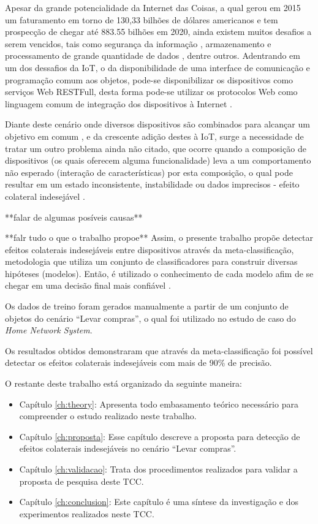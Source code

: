 Apesar da grande potencialidade da Internet das Coisas, a qual gerou em 2015 um faturamento em torno de 130,33 bilhões de dólares americanos e tem prospecção de chegar até 883.55 bilhões em 2020\footnotemark {}, ainda existem muitos desafios a serem vencidos, tais como segurança da informação \cite{Roman:2013}, armazenamento e processamento de grande quantidade de dados \cite{Zaslavsky:2013}, dentre outros. Adentrando em um dos dessafios da IoT, o da disponibilidade de uma interface de comunicação e programação comum aos objetos, pode-se disponibilizar os dispositivos como serviços Web RESTFull, desta forma pode-se utilizar os protocolos Web como linguagem comum de integração dos dispositivos à Internet \cite{Franca:2011, Mineraud:2016}.

Diante deste cenário onde diversos dispositivos são combinados para alcançar um objetivo em comum \cite{Kranz:2010, Atzori:2010, Whitmore:2015}, e da crescente adição destes à IoT, surge a necessidade de tratar um outro problema ainda não citado, que ocorre quando a composição de dispositivos (os quais oferecem alguma funcionalidade) leva a um comportamento não esperado (interação de características) por esta composição, o qual pode resultar em um estado inconsistente, instabilidade ou dados imprecisos - efeito colateral indesejável \cite{NHLABATSI:2008}.

**falar de algumas posíveis causas**

**falr tudo o que o trabalho propoe**
Assim, o presente trabalho propõe detectar efeitos colaterais indesejáveis entre dispositivos através da meta-classificação, metodologia que utiliza um conjunto de classificadores para construir diversas hipóteses (modelos). Então, é utilizado o conhecimento de cada modelo afim de se chegar em uma decisão final mais confiável \cite{Melville:2004}.

Os dados de treino foram gerados manualmente a partir de um conjunto de objetos do cenário ``Levar compras'', o qual foi utilizado no estudo de caso do \textit{Home Network System}.

Os resultados obtidos demonstraram que através da meta-classificação foi possível detectar os efeitos colaterais indesejáveis com mais de 90\% de precisão.

O restante deste trabalho está organizado da seguinte maneira:

\begin{itemize}
\item Capítulo \ref{ch:theory}: Apresenta todo embasamento teórico necessário para compreender o estudo realizado neste trabalho.
\item Capítulo \ref{ch:proposta}: Esse capítulo descreve a proposta para detecção de efeitos colaterais indesejáveis no cenário ``Levar compras''.
\item Capítulo \ref{ch:validacao}: Trata dos procedimentos realizados para validar a proposta de pesquisa deste TCC.
\item Capítulo \ref{ch:conclusion}: Este capítulo é uma síntese da investigação e dos experimentos realizados neste TCC.
\end{itemize}
